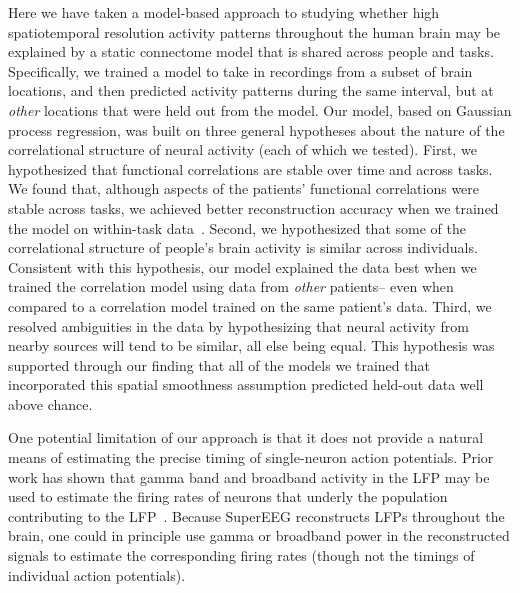 \documentclass[11pt]{article}
\begin{document}
Here we have taken a model-based approach to studying whether high
spatiotemporal resolution activity patterns throughout the human brain
may be explained by a static connectome model that is shared across
people and tasks.  Specifically, we trained a model to take in
recordings from a subset of brain locations, and then predicted
activity patterns during the same interval, but at \textit{other}
locations that were held out from the model.  Our model, based on
Gaussian process regression, was built on three general hypotheses
about the nature of the correlational structure of neural activity
(each of which we tested).  First, we hypothesized that functional
correlations are stable over time and across tasks.  We found that,
although aspects of the patients' functional correlations were
stable across tasks, we achieved better reconstruction accuracy when
we trained the model on within-task data~\citep[we acknowledge that
our general approach could potentially be extended to better model
across-task changes, following][and others]{ColeEtal16, TavoEtal16}.
Second, we hypothesized that some of the correlational structure of
people's brain activity is similar across individuals.  Consistent
with this hypothesis, our model explained the data best when we
trained the correlation model using data from \textit{other}
patients-- even when compared to a correlation model trained on the
same patient's data.  Third, we resolved ambiguities in the data by
hypothesizing that neural activity from nearby sources will tend to be
similar, all else being equal.  This hypothesis was supported through
our finding that all of the models we trained that incorporated this
spatial smoothness assumption predicted held-out data well above chance.

One potential limitation of our approach is that it does not provide a
natural means of estimating the precise timing of single-neuron action
potentials.  Prior work has shown that gamma band and broadband
activity in the LFP may be used to estimate the firing rates of
neurons that underly the population contributing to the
LFP~\citep{MillEtal08, MannEtal09, JacoEtal10b, CronEtal11}.  Because
SuperEEG reconstructs LFPs throughout the brain, one could in
principle use gamma or broadband power in the reconstructed signals to
estimate the corresponding firing rates (though not the timings of
individual action potentials).
\end{document}
